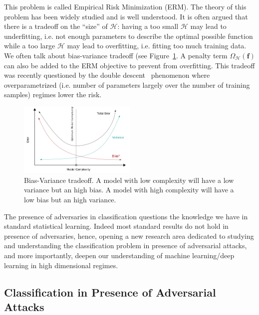 This problem is called Empirical Risk Minimization (ERM). The theory of this problem has been widely studied and is well understood. It is often argued that there is a tradeoff on the ``size'' of $\mathcal{H}$: having a too small $\mathcal{H}$ may lead to underfitting, i.e. not enough parameters to describe the optimal possible function while a too large $\mathcal{H}$ may lead to overfitting, i.e. fitting too much training data. We often talk about bias-variance tradeoff (see Figure~\ref{fig:tradeoff_bias_accuracy}. A penalty term $\Omega_{\mathcal{H}}(\mathbf{f})$ can also be added to the ERM objective to prevent from overfitting. This tradeoff was recently questioned by the double descent~\citep{belkin2019reconciling} phenomenon where overparametrized (i.e. number of parameters largely over the number of training samples) regimes lower the risk.
\begin{figure}
    \centering
    \includegraphics[width=0.5\textwidth]{Images/tradeoff_bias_variance.png}
    \caption{Bias-Variance tradeoff. A model with low complexity will have a low variance but an high bias. A model with high complexity will have a low bias but an high variance.}
    \label{fig:tradeoff_bias_accuracy}
\end{figure}
\begin{tcolorbox}
The presence of adversaries in classification questions the knowledge we have in standard statistical learning. Indeed most standard results do not hold in presence of adversaries, hence, opening a new research area dedicated to studying and understanding the classification problem in presence of adversarial attacks, and more importantly, deepen our understanding of  machine learning/deep learning in high dimensional regimes.
\end{tcolorbox}


\subsection{Classification in Presence of Adversarial Attacks}

